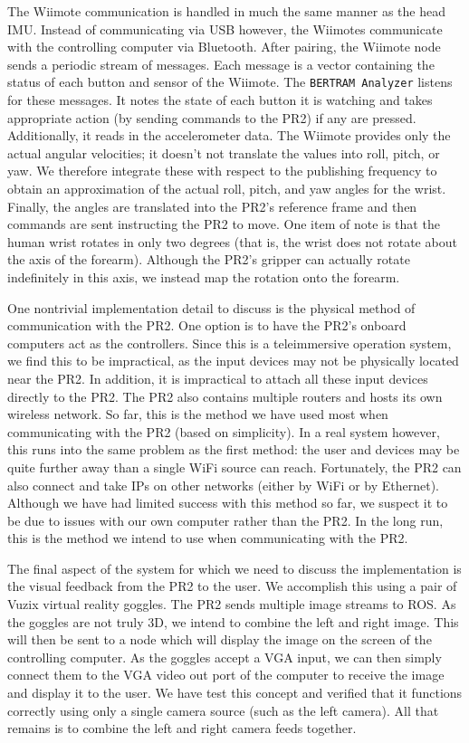 \documentclass{sig-alternate}
\begin{document}
The Wiimote communication is handled in much the same manner as the head IMU.
Instead of communicating via USB however, the Wiimotes communicate with the
controlling computer via Bluetooth. After pairing, the Wiimote node
sends a periodic stream of messages. Each message is a vector containing the
status of each button and sensor of the Wiimote. The {\tt BERTRAM Analyzer}
listens for these messages. It notes the state of each button it is watching
and takes appropriate action (by sending commands to the PR2) if any are
pressed. Additionally, it reads in the accelerometer data. The Wiimote
provides only the actual angular velocities; it doesn't not translate the 
values into roll, pitch, or yaw. We therefore integrate these with respect to 
the publishing frequency to obtain an approximation of the actual roll, pitch,
and yaw angles for the wrist. Finally, the angles are translated into the PR2's
reference frame and then commands are sent instructing the PR2 to move. One 
item of note is that the human wrist rotates in only two degrees (that is,
the wrist does not rotate about the axis of the forearm). Although the PR2's 
gripper can actually rotate indefinitely in this axis, we instead map the 
rotation onto the forearm.

One nontrivial implementation detail to discuss is the physical method of
communication with the PR2. One option is to have the PR2's onboard computers
act as the controllers. Since this is a teleimmersive operation system, we find
this to be impractical, as the input devices may not be physically located
near the PR2. In addition, it is impractical to attach all these input devices 
directly to the PR2. The PR2 also contains multiple routers and hosts its
own wireless network. So far, this is the method we have used most when
communicating with the PR2 (based on simplicity). In a real system however,
this runs into the same problem as the first method: the user and devices
may be quite further away than a single WiFi source can reach. Fortunately,
the PR2 can also connect and take IPs on other networks (either by WiFi or by
Ethernet). Although we have had limited success with this method so far, we
suspect it to be due to issues with our own computer rather than the PR2.
In the long run, this is the method we intend to use when communicating with 
the PR2.

The final aspect of the system for which we need to discuss the implementation
is the visual feedback from the PR2 to the user. We accomplish this using a
pair of  Vuzix virtual reality goggles. The PR2 sends multiple image 
streams to ROS. As the goggles are not truly 3D, we intend to combine the left 
and right image. This will then be sent to a node which will display the image
on the screen of the controlling computer. As the goggles accept a VGA input,
we can then simply connect them to the VGA video out port of the computer to
receive the image and display it to the user. We have test this concept and
verified that it functions correctly using only a single camera source (such as
the left camera). All that remains is to combine the left and right camera
feeds together.
\end{document}
